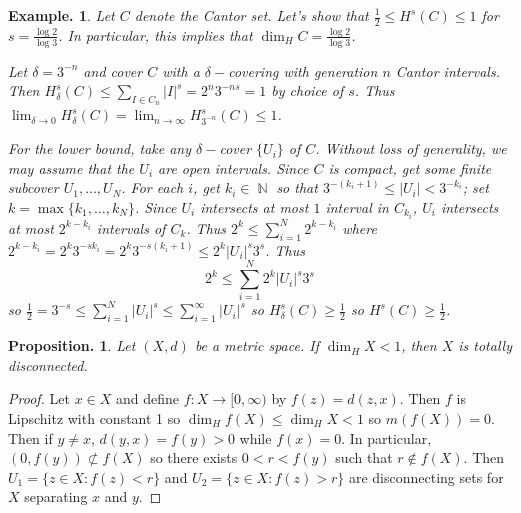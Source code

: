 \documentclass[11pt, a4paper]{memoir}
\DeclareMathOperator{\N}{{\mathbb{N}}}
\theoremstyle{change}
\newtheorem{proposition}[theorem]{Proposition.}
\theoremstyle{plain}
\theoremstyle{nonumberplain}
\newtheorem{example}{Example.}
\newtheorem{proof}{Proof}
\numberwithin{equation}{section}
\begin{document}
\begin{example}
    Let $C$ denote the Cantor set.
    Let's show that $\frac{1}{2}\leq H^s(C)\leq 1$ for $s=\frac{\log 2}{\log 3}$.
    In particular, this implies that $\dim_H C=\frac{\log 2}{\log 3}$.

    Let $\delta=3^{-n}$ and cover $C$ with a $\delta-$covering with generation $n$ Cantor intervals.
    Then $H_\delta^s(C)\leq \sum_{I\in C_n}|I|^s=2^n3^{-ns}=1$ by choice of $s$.
    Thus $\lim_{\delta\to 0}H_\delta^s(C)=\lim_{n\to\infty}H^s_{3^{-n}}(C)\leq 1$.

    For the lower bound, take any $\delta-$cover $\{U_i\}$ of $C$.
    Without loss of generality, we may assume that the $U_i$ are open intervals.
    Since $C$ is compact, get some finite subcover $U_1,\ldots,U_N$.
    For each $i$, get $k_i\in\N$ so that $3^{-(k_i+1)}\leq|U_i|<3^{-k_i}$; set $k=\max\{k_1,\ldots,k_N\}$.
    Since $U_i$ intersects at most $1$ interval in $C_{k_i}$, $U_i$ intersects at most $2^{k-k_i}$ intervals of $C_k$.
    Thus $2^k\leq\sum_{i=1}^N 2^{k-k_i}$ where $2^{k-k_i}=2^k3^{-sk_i}=2^k3^{-s(k_i+1)}\leq 2^k|U_i|^s3^s$.
    Thus
    \begin{equation*}
        2^k\leq\sum_{i=1}^N2^k|U_i|^s3^s
    \end{equation*}
    so $\frac{1}{2}=3^{-s}\leq \sum_{i=1}^N|U_i|^s\leq \sum_{i=1}^\infty|U_i|^s$ so $H^s_\delta(C)\geq\frac{1}{2}$ so $H^s(C)\geq\frac{1}{2}$.
\end{example}
\begin{proposition}
    Let $(X,d)$ be a metric space.
    If $\dim_H X<1$, then $X$ is totally disconnected.
\end{proposition}
\begin{proof}
    Let $x\in X$ and define $f:X\to[0,\infty)$ by $f(z)=d(z,x)$.
    Then $f$ is Lipschitz with constant 1 so $\dim_Hf(X)\leq\dim_H X<1$ so $m(f(X))=0$.
    Then if $y\neq x$, $d(y,x)=f(y)>0$ while $f(x)=0$.
    In particular, $(0,f(y))\not\subset f(X)$ so there exists $0<r<f(y)$ such that $r\notin f(X)$.
    Then $U_1=\{z\in X:f(z)<r\}$ and $U_2=\{z\in X:f(z)>r\}$ are disconnecting sets for $X$ separating $x$ and $y$.

\end{proof}
\end{document}
